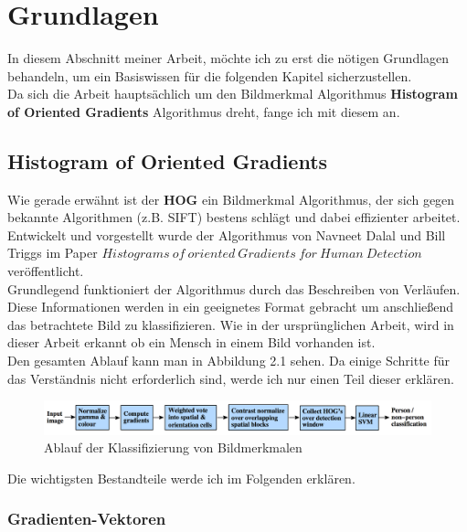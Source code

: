 \chapter{Grundlagen}
\label{chap:grundlagen}

In diesem Abschnitt meiner Arbeit, möchte ich zu erst die nötigen Grundlagen behandeln, um ein Basiswissen für die folgenden Kapitel sicherzustellen.\\
Da sich die Arbeit hauptsächlich um den Bildmerkmal Algorithmus \textbf{Histogram of Oriented Gradients} Algorithmus dreht, fange ich mit diesem an.
\section{Histogram of Oriented Gradients}
\label{sec:grundlagenhog}
Wie gerade erwähnt ist der \textbf{HOG} ein Bildmerkmal Algorithmus, der sich gegen bekannte Algorithmen (z.B. SIFT) bestens schlägt und dabei  effizienter arbeitet. Entwickelt und vorgestellt wurde der Algorithmus von Navneet Dalal und Bill Triggs im Paper $Histograms~of ~oriented~Gradients~for~Human~Detection$ \cite{dalal:inria-00548512} veröffentlicht.\\
Grundlegend funktioniert der Algorithmus durch das Beschreiben von Verläufen. Diese Informationen werden in ein geeignetes Format gebracht um anschließend das betrachtete Bild zu klassifizieren. Wie in der ursprünglichen Arbeit, wird in dieser Arbeit erkannt ob ein Mensch in  einem Bild vorhanden ist.\\
Den gesamten Ablauf kann man in Abbildung 2.1 sehen. Da einige Schritte für das Verständnis nicht erforderlich sind, werde ich nur einen Teil dieser erklären.

\begin{figure}[htbp]\centering 
	\includegraphics[width=1\linewidth]{./pics/feature extraction chain.png} 
	\caption{Ablauf der Klassifizierung von Bildmerkmalen
	\cite{dalal:inria-00548512}}\label{fig:grundlagen_feature_extraction_chain}\end{figure}

Die wichtigsten Bestandteile werde ich im Folgenden erklären.

\subsection{Gradienten-Vektoren}

